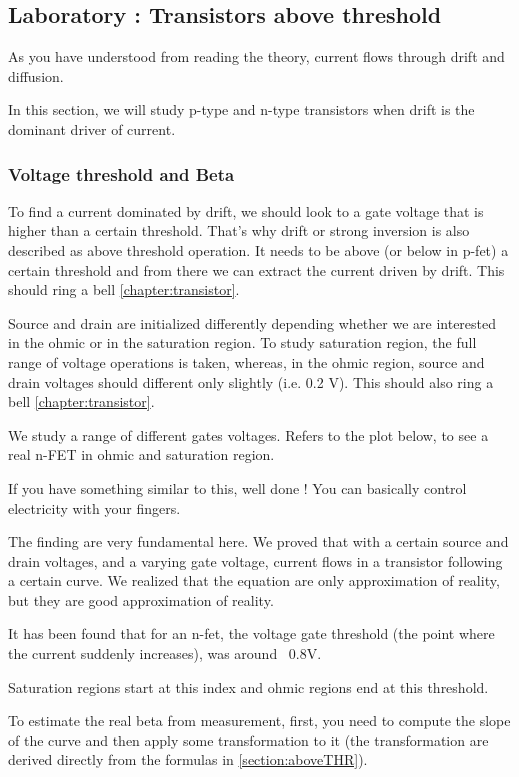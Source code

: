 \subsection{Laboratory : Transistors above threshold}

As you have understood from reading the theory, current flows through drift and diffusion.

In this section, we will study p-type and n-type transistors when drift is the dominant driver of current. 

\subsubsection{Voltage threshold and Beta}

To find a current dominated by drift, we should look to a gate voltage that is higher than a certain threshold. That's why drift or strong inversion is also described as above threshold operation. It needs to be above (or below in p-fet) a certain threshold and from there we can extract the current driven by drift. This should ring a bell \ref{chapter:transistor}. 

Source and drain are initialized differently depending whether we are interested in the ohmic or in the saturation region. 
To study saturation region, the full range of voltage operations is taken, whereas, in the ohmic region, source and drain voltages should different only slightly (i.e. 0.2 V). This should also ring a bell \ref{chapter:transistor}. 

We study a range of different gates voltages. Refers to the plot below, to see a real  n-FET in ohmic and saturation region. 

If you have something similar to this, well done ! You can basically control electricity with your fingers. 

The finding are very fundamental here. We proved that with a certain source and drain voltages, and a varying gate voltage, current flows in a transistor following a certain curve.
We realized that the equation are only approximation of reality, but they are good approximation of reality.

It has been found that for an n-fet, the voltage gate threshold (the point where the current suddenly increases), was around ~0.8V. 

Saturation regions start at this index and ohmic regions end at this threshold. 

To estimate the real beta from measurement, first, you need to compute the slope of the curve and then apply some transformation to it (the transformation are derived directly from the formulas in \ref{section:aboveTHR}). 


